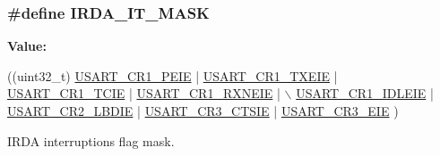 \subsubsection[{\texorpdfstring{I\+R\+D\+A\+\_\+\+I\+T\+\_\+\+M\+A\+SK}{IRDA_IT_MASK}}]{\setlength{\rightskip}{0pt plus 5cm}\#define I\+R\+D\+A\+\_\+\+I\+T\+\_\+\+M\+A\+SK}\hypertarget{group___i_r_d_a___private___constants_ga38eeb904e4117f70c18bf3767c7ba4a6}{}\label{group___i_r_d_a___private___constants_ga38eeb904e4117f70c18bf3767c7ba4a6}
{\bfseries Value\+:}
\begin{DoxyCode}
((uint32\_t) \hyperlink{group___peripheral___registers___bits___definition_ga27405d413b6d355ccdb076d52fef6875}{USART\_CR1\_PEIE} | \hyperlink{group___peripheral___registers___bits___definition_ga70422871d15f974b464365e7fe1877e9}{USART\_CR1\_TXEIE} | 
      \hyperlink{group___peripheral___registers___bits___definition_gaa17130690a1ca95b972429eb64d4254e}{USART\_CR1\_TCIE} | \hyperlink{group___peripheral___registers___bits___definition_ga91118f867adfdb2e805beea86666de04}{USART\_CR1\_RXNEIE} | \(\backslash\)
                                  \hyperlink{group___peripheral___registers___bits___definition_ga5221d09eebd12445a20f221bf98066f8}{USART\_CR1\_IDLEIE} | 
      \hyperlink{group___peripheral___registers___bits___definition_gaa02ef5d22553f028ea48e5d9f08192b4}{USART\_CR2\_LBDIE} | \hyperlink{group___peripheral___registers___bits___definition_ga636d5ec2e9556949fc68d13ad45a1e90}{USART\_CR3\_CTSIE} | \hyperlink{group___peripheral___registers___bits___definition_gaaed1a39c551b1641128f81893ff558d0}{USART\_CR3\_EIE} )
\end{DoxyCode}


I\+R\+DA interruptions flag mask. 

